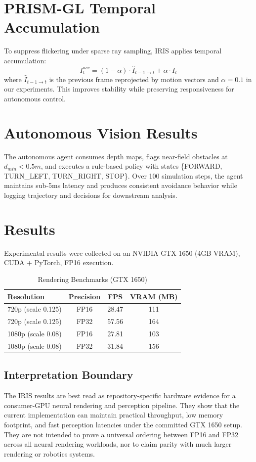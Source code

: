 \documentclass[conference]{IEEEtran}
\begin{document}
\section{PRISM-GL Temporal Accumulation}
To suppress flickering under sparse ray sampling, IRIS applies temporal accumulation:
\begin{equation}
I_t^{acc} = (1 - \alpha) \cdot \hat{I}_{t-1 \rightarrow t} + \alpha \cdot I_t
\end{equation}
where $\hat{I}_{t-1 \rightarrow t}$ is the previous frame reprojected by motion vectors and $\alpha = 0.1$ in our experiments. This improves stability while preserving responsiveness for autonomous control.

\section{Autonomous Vision Results}
The autonomous agent consumes depth maps, flags near-field obstacles at $d_{min}<0.5m$, and executes a rule-based policy with states \{FORWARD, TURN\_LEFT, TURN\_RIGHT, STOP\}. Over 100 simulation steps, the agent maintains sub-5ms latency and produces consistent avoidance behavior while logging trajectory and decisions for downstream analysis.

\section{Results}
Experimental results were collected on an NVIDIA GTX 1650 (4GB VRAM), CUDA + PyTorch, FP16 execution.

\begin{table}[h]
\caption{Rendering Benchmarks (GTX 1650)}
\centering
\begin{tabular}{lccc}
\hline
Resolution & Precision & FPS & VRAM (MB) \\
\hline
720p (scale 0.125) & FP16 & 28.47 & 111 \\
720p (scale 0.125) & FP32 & 57.56 & 164 \\
1080p (scale 0.08) & FP16 & 27.81 & 103 \\
1080p (scale 0.08) & FP32 & 31.84 & 156 \\
\hline
\end{tabular}
\end{table}

\subsection{Interpretation Boundary}
The IRIS results are best read as repository-specific hardware evidence for a
consumer-GPU neural rendering and perception pipeline. They show that the
current implementation can maintain practical throughput, low memory footprint,
and fast perception latencies under the committed GTX 1650 setup. They are not
intended to prove a universal ordering between FP16 and FP32 across all neural
rendering workloads, nor to claim parity with much larger rendering or robotics
systems.
\end{document}
